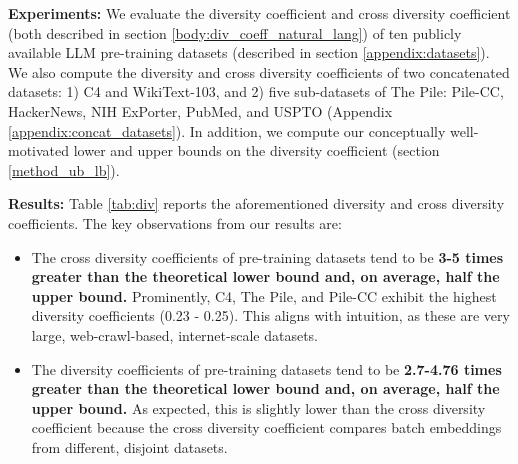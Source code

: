 \textbf{Experiments:} 
We evaluate the diversity coefficient and cross diversity coefficient (both described in section \ref{body:div_coeff_natural_lang}) of ten publicly available LLM pre-training datasets (described in section \ref{appendix:datasets}).
We also compute the diversity and cross diversity coefficients of two concatenated datasets: 
1) C4 and WikiText-103, and 
2) five sub-datasets of The Pile: Pile-CC, HackerNews, NIH ExPorter, PubMed, and USPTO (Appendix \ref{appendix:concat_datasets}).
In addition, we compute our conceptually well-motivated lower and upper bounds on the diversity coefficient (section \ref{method_ub_lb}).

\textbf{Results:}
Table \ref{tab:div} reports the aforementioned diversity and cross diversity coefficients. 
The key observations from our results are:
\begin{itemize}
    \item The cross diversity coefficients of pre-training datasets tend to be \textbf{3-5 times greater than the theoretical lower bound and, on average, half the upper bound.} 
    Prominently, C4, The Pile, and Pile-CC exhibit the highest diversity coefficients (0.23 - 0.25). This aligns with intuition, as these are very large, web-crawl-based, internet-scale datasets. 
    \item The diversity coefficients of pre-training datasets tend to be \textbf{2.7-4.76 times greater than the theoretical lower bound and, on average, half the upper bound.}
    As expected, this is slightly lower than the cross diversity coefficient because the cross diversity coefficient compares batch embeddings from different, disjoint datasets.
\end{itemize}


